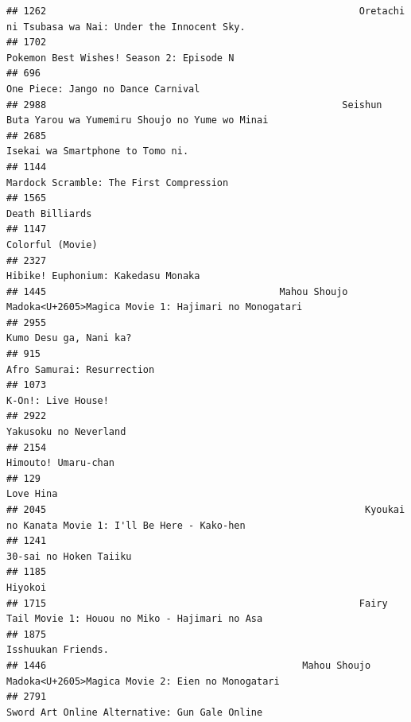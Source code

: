 \documentclass[
]{article}
\begin{document}
\begin{verbatim}
## 1262                                                       Oretachi ni Tsubasa wa Nai: Under the Innocent Sky.
## 1702                                                                  Pokemon Best Wishes! Season 2: Episode N
## 696                                                                         One Piece: Jango no Dance Carnival
## 2988                                                    Seishun Buta Yarou wa Yumemiru Shoujo no Yume wo Minai
## 2685                                                                          Isekai wa Smartphone to Tomo ni.
## 1144                                                                   Mardock Scramble: The First Compression
## 1565                                                                                           Death Billiards
## 1147                                                                                          Colorful (Movie)
## 2327                                                                        Hibike! Euphonium: Kakedasu Monaka
## 1445                                         Mahou Shoujo Madoka<U+2605>Magica Movie 1: Hajimari no Monogatari
## 2955                                                                                    Kumo Desu ga, Nani ka?
## 915                                                                                 Afro Samurai: Resurrection
## 1073                                                                                        K-On!: Live House!
## 2922                                                                                     Yakusoku no Neverland
## 2154                                                                                       Himouto! Umaru-chan
## 129                                                                                                  Love Hina
## 2045                                                        Kyoukai no Kanata Movie 1: I'll Be Here - Kako-hen
## 1241                                                                                    30-sai no Hoken Taiiku
## 1185                                                                                                   Hiyokoi
## 1715                                                       Fairy Tail Movie 1: Houou no Miko - Hajimari no Asa
## 1875                                                                                        Isshuukan Friends.
## 1446                                             Mahou Shoujo Madoka<U+2605>Magica Movie 2: Eien no Monogatari
## 2791                                                             Sword Art Online Alternative: Gun Gale Online

\end{verbatim}
\end{document}
